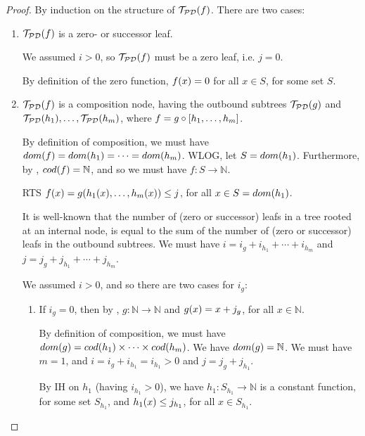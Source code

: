 \begin{proof} By induction on the structure of $\mathcal{T}_\mathcal{PD}{\mathopen{}\left({f}\right)\mathclose{}}$.
There are two cases:\begin{enumerate}[label=(\arabic*)]

\item $\mathcal{T}_\mathcal{PD}{\mathopen{}\left({f}\right)\mathclose{}}$ is a zero- or successor leaf.

We assumed $i > 0$, so $\mathcal{T}_\mathcal{PD}{\mathopen{}\left({f}\right)\mathclose{}}$ must be a zero leaf,
i.e. $j = 0$.

By definition of the zero function, $f{\mathopen{}\left({x}\right)\mathclose{}} = 0$ for all $x \in S$, for some
set $S$.

\item $\mathcal{T}_\mathcal{PD}{\mathopen{}\left({f}\right)\mathclose{}}$ is a composition node, having the
outbound subtrees $\mathcal{T}_\mathcal{PD}{\mathopen{}\left({g}\right)\mathclose{}}$ and
$\mathcal{T}_\mathcal{PD}{\mathopen{}\left({h_1}\right)\mathclose{}}, \ldots, \mathcal{T}_\mathcal{PD}{\mathopen{}\left({h_m}\right)\mathclose{}}$,
where $f = g \circ \mathopen{}\left[{h_1, \ldots, h_m}\right]\mathclose{}$.

By definition of composition, we must have $dom{\mathopen{}\left({f}\right)\mathclose{}} = dom{\mathopen{}\left({h_1}\right)\mathclose{}} = \cdots =
dom{\mathopen{}\left({h_m}\right)\mathclose{}}$. WLOG, let $S=dom{\mathopen{}\left({h_1}\right)\mathclose{}}$. Furthermore, by
, $cod{\mathopen{}\left({f}\right)\mathclose{}} = \mathbb{N}$, and so we must have $f : S
\rightarrow \mathbb{N}$.

RTS $f{\mathopen{}\left({x}\right)\mathclose{}} = g{\mathopen{}\left({h_1{\mathopen{}\left({x}\right)\mathclose{}}, \ldots, h_m{\mathopen{}\left({x}\right)\mathclose{}}}\right)\mathclose{}} \leq j$, for all $x \in S =
dom{\mathopen{}\left({h_1}\right)\mathclose{}}$.

It is well-known that the number of (zero or successor) leafs in a tree rooted
at an internal node, is equal to the sum of the number of (zero or successor)
leafs in the outbound subtrees. We must have $i = i_g + i_{h_1} + \cdots +
i_{h_m}$ and $j = j_g + j_{h_1} + \cdots + j_{h_m}$.

We assumed $i > 0$, and so there are two cases for $i_g$:

\begin{enumerate}[label=(\alph*)]

\item If $i_g=0$, then by , $g : \mathbb{N} \rightarrow
\mathbb{N}$ and $g{\mathopen{}\left({x}\right)\mathclose{}} = x + j_g$, for all $x \in \mathbb{N}$.

By definition of composition, we must have $dom{\mathopen{}\left({g}\right)\mathclose{}} = cod{\mathopen{}\left({h_1}\right)\mathclose{}} \times \cdots
\times cod{\mathopen{}\left({h_m}\right)\mathclose{}}$. We have $dom{\mathopen{}\left({g}\right)\mathclose{}}=\mathbb{N}$. We must have $m=1$, and $i =
i_g + i_{h_1} = i_{h_1} > 0$ and $j = j_g + j_{h_1}$.

By IH on $h_1$ (having $i_{h_1} > 0$), we have $h_1 : S_{h_1} \rightarrow
\mathbb{N}$ is a constant function, for some set $S_{h_1}$, and $h_1{\mathopen{}\left({x}\right)\mathclose{}} \leq
j_{h_1}$, for all $x \in S_{h_1}$.


\end{enumerate}
\end{enumerate}
\end{proof}
